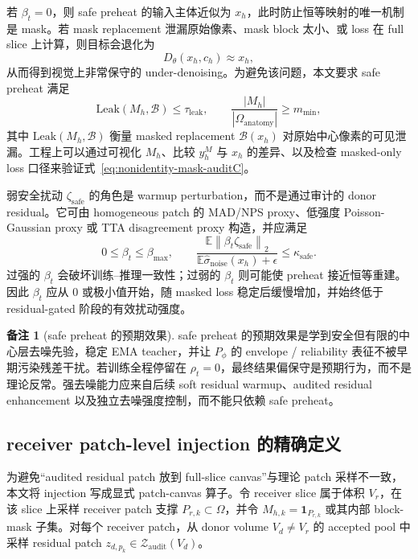 \documentclass[11pt,a4paper,UTF8,fontset=fandol]{ctexart}
\theoremstyle{definition}
\newtheorem{remark}[theorem]{备注}
\newcommand{\norm}[1]{\left\lVert#1\right\rVert}
\newcommand{\E}{\mathbb{E}}
\newcommand{\cZ}{\mathcal{Z}}
\newcommand{\one}{\mathbf{1}}
\begin{document}
若 $\beta_t=0$，则 safe preheat 的输入主体近似为 $x_h$，此时防止恒等映射的唯一机制是 mask。若 mask replacement 泄漏原始像素、mask block 太小、或 loss 在 full slice 上计算，则目标会退化为
\begin{equation}
    D_\theta(x_h,c_h)\approx x_h,
\end{equation}
从而得到视觉上非常保守的 under-denoising。为避免该问题，本文要求 safe preheat 满足
\begin{equation}
\label{eq:nonidentity-mask-auditC}
    \mathrm{Leak}(M_h,\mathcal B)\le \tau_{\mathrm{leak}},
    \qquad
    \frac{|M_h|}{|\Omega_{\mathrm{anatomy}}|}\ge m_{\min},
\end{equation}
其中 $\mathrm{Leak}(M_h,\mathcal B)$ 衡量 masked replacement $\mathcal B(x_h)$ 对原始中心像素的可见泄漏。工程上可以通过可视化 $M_h$、比较 $y_h^M$ 与 $x_h$ 的差异、以及检查 masked-only loss 口径来验证式~\eqref{eq:nonidentity-mask-auditC}。

弱安全扰动 $\zeta_{\mathrm{safe}}$ 的角色是 warmup perturbation，而不是通过审计的 donor residual。它可由 homogeneous patch 的 MAD/NPS proxy、低强度 Poisson-Gaussian proxy 或 TTA disagreement proxy 构造，并应满足
\begin{equation}
\label{eq:safe-perturb-scale-auditC}
    0\le \beta_t\le \beta_{\max},
    \qquad
    \frac{\E\norm{\beta_t\zeta_{\mathrm{safe}}}_2}{\E\widehat\sigma_{\mathrm{noise}}(x_h)+\epsilon}\le \kappa_{\mathrm{safe}}.
\end{equation}
过强的 $\beta_t$ 会破坏训练--推理一致性；过弱的 $\beta_t$ 则可能使 preheat 接近恒等重建。因此 $\beta_t$ 应从 $0$ 或极小值开始，随 masked loss 稳定后缓慢增加，并始终低于 residual-gated 阶段的有效扰动强度。

\begin{remark}[safe preheat 的预期效果]
safe preheat 的预期效果是学到安全但有限的中心层去噪先验，稳定 EMA teacher，并让 $P_\phi$ 的 envelope / reliability 表征不被早期污染残差干扰。若训练全程停留在 $\rho_t=0$，最终结果偏保守是预期行为，而不是理论反常。强去噪能力应来自后续 soft residual warmup、audited residual enhancement 以及独立去噪强度控制，而不能只依赖 safe preheat。
\end{remark}

\subsection{receiver patch-level injection 的精确定义}

为避免“audited residual patch 放到 full-slice canvas”与理论 patch 采样不一致，本文将 injection 写成显式 patch-canvas 算子。令 receiver slice 属于体积 $V_r$，在该 slice 上采样 receiver patch 支撑 $P_{r,k}\subset\Omega$，并令 $M_{h,k}=\one_{P_{r,k}}$ 或其内部 block-mask 子集。对每个 receiver patch，从 donor volume $V_d\ne V_r$ 的 accepted pool 中采样 residual patch $z_{d,p_k}\in\cZ_{\mathrm{audit}}(V_d)$。
\end{document}
